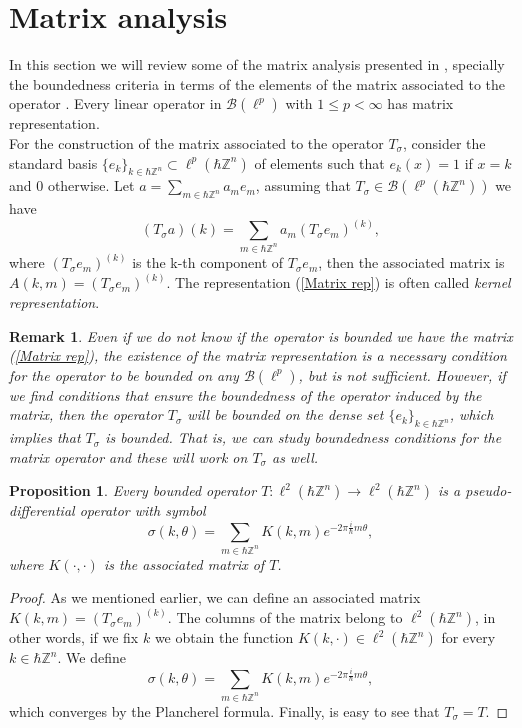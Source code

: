 \documentclass[pdflatex,sn-mathphys-num]{sn-jnl}%
\theoremstyle{thmstyleone}%
\newtheorem{proposition}[theorem]{Proposition}
\theoremstyle{thmstyletwo}%
\newtheorem{remark}{Remark}%
\theoremstyle{thmstylethree}%
\begin{document}
\section{Matrix analysis}\label{section matrix analysis}
\indent In this section we will review some of the matrix analysis presented in \cite{maddox1988elements,maddox2006infinite}, specially the boundedness criteria in terms of the elements of the matrix associated to the operator \cite{maddox1988elements}. Every linear operator in $\mathcal{B}(\ell^p)$ with $1\leq p< \infty$ has matrix representation.\\
\indent For the construction of the matrix associated to the operator $T_\sigma$, consider the standard basis $\{e_k\}_{k\in\hbar\mathbb{Z}^n}\subset \ell^p(\hbar\mathbb{Z}^n)$ of elements such that $e_k(x)=1$ if $x=k$ and 0 otherwise. Let $a=\sum_{m\in\hbar\mathbb{Z}^n} a_m e_m $, assuming that $T_\sigma\in\mathcal{B}(\ell^p(\hbar\mathbb{Z}^n))$ we have 
\begin{equation}\label{Matrix rep}
(T_\sigma a)(k)=\sum_{m\in\hbar\mathbb{Z}^n} a_m (T_\sigma e_m)^{(k)},
\end{equation}
where $(T_\sigma e_m)^{(k)}$ is the k-th component of $T_\sigma e_m$, then the associated matrix is $A(k,m)=(T_\sigma e_m)^{(k)}$. The representation (\ref{Matrix rep}) is often called \textit{kernel representation}.
\begin{remark}
    Even if we do not know if the operator is bounded we have the matrix (\ref{Matrix rep}), the existence of the matrix representation is a necessary condition for the operator to be bounded on any $\mathcal{B}(\ell^p)$, but is not sufficient. However, if we find conditions that ensure the boundedness of the operator induced by the matrix, then the operator $T_\sigma$ will be bounded on the dense set $\{e_k\}_{k\in\hbar\mathbb{Z}^n}$,   which implies that $T_\sigma$ is bounded. That is, we can study boundedness conditions for the matrix operator  and these will work on $T_\sigma$ as well.
\end{remark}  

\begin{proposition}
    Every bounded operator $T:\ell^{2}(\hbar\mathbb{Z}^n)\to\ell^{2}(\hbar\mathbb{Z}^n)$ is a pseudo-differential operator with symbol
    \[\sigma(k,\theta)= \sum_{m\in\hbar\mathbb{Z}^n} K(k,m)e^{-2\pi\frac{i}{\hbar}m\theta}, \]
    where $K(\cdot,\cdot)$ is the associated matrix of $T$. 
\end{proposition}
\begin{proof}
    As we mentioned earlier, we can define an associated matrix $K(k,m)=(T_\sigma e_m)^{(k)}$. The columns of the matrix belong to $\ell^{2}(\hbar\mathbb{Z}^n)$, in other words, if we fix $k$ we obtain the function $K(k,\cdot)\in \ell^{2}(\hbar\mathbb{Z}^n) $ for every $k\in\hbar\mathbb{Z}^n$. We define  
     \[\sigma(k,\theta)= \sum_{m\in\hbar\mathbb{Z}^n} K(k,m)e^{-2\pi\frac{i}{\hbar}m\theta},\]
     which converges by the Plancherel formula. Finally, is easy to see that $T_\sigma=T$.
\end{proof}
\end{document}
